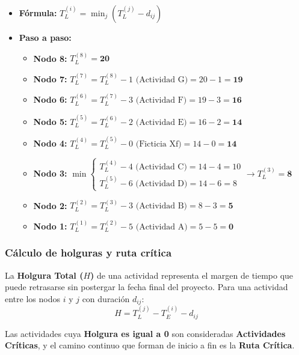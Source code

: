 \documentclass[12pt]{article}
\begin{document}
\begin{itemize}
    \item \textbf{Fórmula:} $T_L^{(i)} = \min_{j} (T_L^{(j)} - d_{ij})$
    \item \textbf{Paso a paso:}
    \begin{itemize}
        \item \textbf{Nodo 8:} $T_L^{(8)} = \mathbf{20}$
        \item \textbf{Nodo 7:} $T_L^{(7)} = T_L^{(8)} - 1 \text{ (Actividad G)} = 20 - 1 = \mathbf{19}$
        \item \textbf{Nodo 6:} $T_L^{(6)} = T_L^{(7)} - 3 \text{ (Actividad F)} = 19 - 3 = \mathbf{16}$
        \item \textbf{Nodo 5:} $T_L^{(5)} = T_L^{(6)} - 2 \text{ (Actividad E)} = 16 - 2 = \mathbf{14}$
        \item \textbf{Nodo 4:} $T_L^{(4)} = T_L^{(5)} - 0 \text{ (Ficticia Xf)} = 14 - 0 = \mathbf{14}$
        \item \textbf{Nodo 3:} $\min \begin{cases} T_L^{(4)} - 4 \text{ (Actividad C)} = 14 - 4 = 10 \\ T_L^{(5)} - 6 \text{ (Actividad D)} = 14 - 6 = 8 \end{cases} \rightarrow T_L^{(3)} = \mathbf{8}$
        \item \textbf{Nodo 2:} $T_L^{(2)} = T_L^{(3)} - 3 \text{ (Actividad B)} = 8 - 3 = \mathbf{5}$
        \item \textbf{Nodo 1:} $T_L^{(1)} = T_L^{(2)} - 5 \text{ (Actividad A)} = 5 - 5 = \mathbf{0}$
    \end{itemize}
\end{itemize}

\subsubsection{Cálculo de holguras y ruta crítica}
La \textbf{Holgura Total ($H$)} de una actividad representa el margen de tiempo que puede retrasarse sin postergar la fecha final del proyecto. Para una actividad entre los nodos $i$ y $j$ con duración $d_{ij}$:
\begin{equation*}
 H = T_L^{(j)} - T_E^{(i)} - d_{ij}
\end{equation*}

Las actividades cuya \textbf{Holgura es igual a 0} son consideradas \textbf{Actividades Críticas}, y el camino continuo que forman de inicio a fin es la \textbf{Ruta Crítica}.
\end{document}
